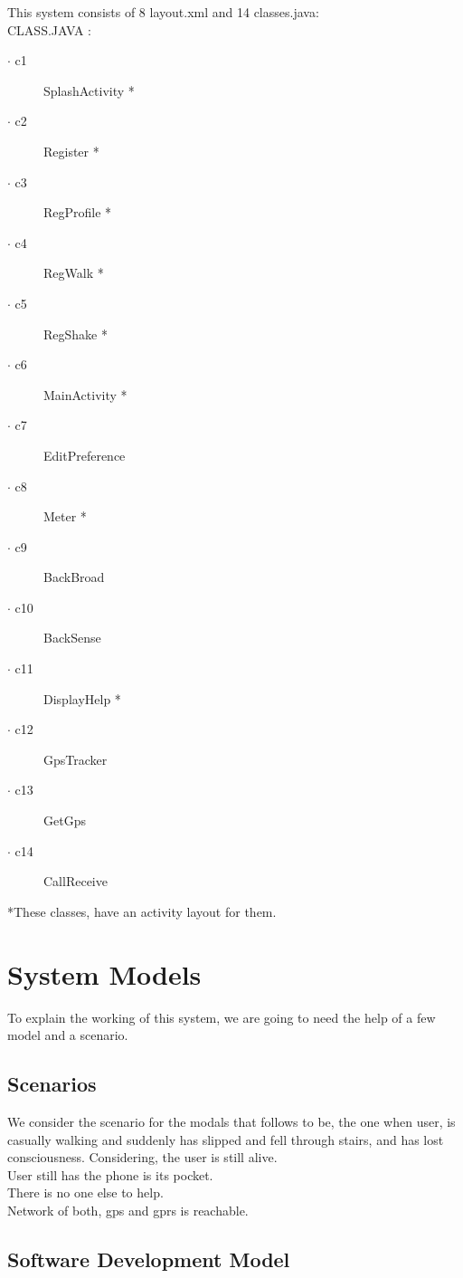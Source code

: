 This system consists of 8 layout.xml and 14 classes.java:\\
CLASS.JAVA :
\begin{description}
\item[$\cdot$ c1] SplashActivity *
\item[$\cdot$ c2] Register *
\item[$\cdot$ c3] RegProfile *
\item[$\cdot$ c4] RegWalk *
\item[$\cdot$ c5] RegShake *
\item[$\cdot$ c6] MainActivity *
\item[$\cdot$ c7] EditPreference
\item[$\cdot$ c8] Meter *
\item[$\cdot$ c9] BackBroad
\item[$\cdot$ c10] BackSense
\item[$\cdot$ c11] DisplayHelp *
\item[$\cdot$ c12] GpsTracker
\item[$\cdot$ c13] GetGps
\item[$\cdot$ c14] CallReceive
\end{description}

\vfill 
*These classes, have an activity layout for them. 
\newpage
\section{System Models}
\label{sec:sec03}

To explain the working of this system, we are going to need the help of a few model and a scenario.


\subsection{Scenarios}
\label{subsec:subsec01}

We consider the scenario for the modals that follows to be, the one when user, is casually walking and suddenly has slipped and fell through stairs, and has lost consciousness.
Considering, the user is still alive.\\
User still has the phone is its pocket.\\
There is no one else to help.\\
Network of both, gps and gprs is reachable.

\subsection{Software Development Model}
\label{subsec:subsec02}

